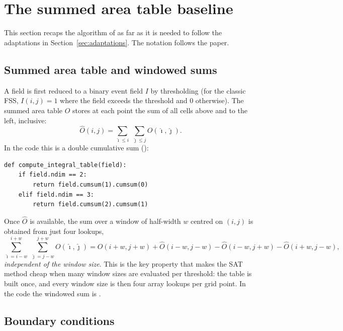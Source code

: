 \section{The summed area table baseline}
\label{sec:baseline}

This section recaps the algorithm of \citet{faggian2015} as far as it is needed
to follow the adaptations in Section~\ref{sec:adaptations}. The notation follows
the paper.

\subsection{Summed area table and windowed sums}

A field is first reduced to a binary event field $I$ by thresholding (for the
classic FSS, $I(i,j)=1$ where the field exceeds the threshold and $0$
otherwise). The summed area table $\hat{O}$ stores at each point the sum of all
cells above and to the left, inclusive:
%
\begin{equation}
  \hat{O}(i,j) = \sum_{\hat{\imath}\le i}\;\sum_{\hat{\jmath}\le j}
                 O(\hat{\imath},\hat{\jmath}).
  \label{eq:sat}
\end{equation}
%
In the code this is a double cumulative sum ():

{\begin{lstlisting}[style=python]
def compute_integral_table(field):
    if field.ndim == 2:
        return field.cumsum(1).cumsum(0)
    elif field.ndim == 3:
        return field.cumsum(2).cumsum(1)
\end{lstlisting}}

Once $\hat{O}$ is available, the sum over a window of half-width $w$ centred on
$(i,j)$ is obtained from just four lookups,
%
\begin{equation}
  \sum_{\hat{\imath}=i-w}^{i+w}\;\sum_{\hat{\jmath}=j-w}^{j+w}
  O(\hat{\imath},\hat{\jmath})
  = \hat{O}(i+w, j+w) + \hat{O}(i-w, j-w)
  - \hat{O}(i-w, j+w) - \hat{O}(i+w, j-w),
  \label{eq:boxsum}
\end{equation}
%
\emph{independent of the window size}. This is the key property that makes the
SAT method cheap when many window sizes are evaluated per threshold: the table
is built once, and every window size is then four array lookups per grid point.
In the code the windowed sum is .

\subsection{Boundary conditions}

